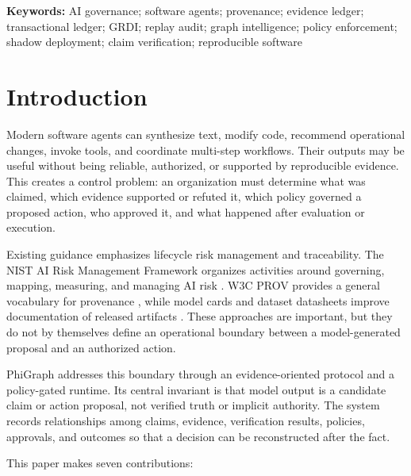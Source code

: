 \documentclass[11pt]{article}
\begin{document}
\noindent\textbf{Keywords:} AI governance; software agents; provenance;
evidence ledger; transactional ledger; GRDI; replay audit; graph intelligence;
policy enforcement; shadow deployment; claim verification; reproducible software

\section{Introduction}

Modern software agents can synthesize text, modify code, recommend operational
changes, invoke tools, and coordinate multi-step workflows. Their outputs may
be useful without being reliable, authorized, or supported by reproducible
evidence. This creates a control problem: an organization must determine what
was claimed, which evidence supported or refuted it, which policy governed a
proposed action, who approved it, and what happened after evaluation or
execution.

Existing guidance emphasizes lifecycle risk management and traceability.
The NIST AI Risk Management Framework organizes activities around governing,
mapping, measuring, and managing AI risk \cite{nist2023airmf}. W3C PROV provides
a general vocabulary for provenance \cite{lebo2013provo}, while model cards and
dataset datasheets improve documentation of released artifacts
\cite{mitchell2019modelcards,gebru2021datasheets}. These approaches are
important, but they do not by themselves define an operational boundary
between a model-generated proposal and an authorized action.

PhiGraph addresses this boundary through an evidence-oriented protocol and a
policy-gated runtime. Its central invariant is that model output is a candidate
claim or action proposal, not verified truth or implicit authority. The system
records relationships among claims, evidence, verification results, policies,
approvals, and outcomes so that a decision can be reconstructed after the
fact.

This paper makes seven contributions:
\end{document}
